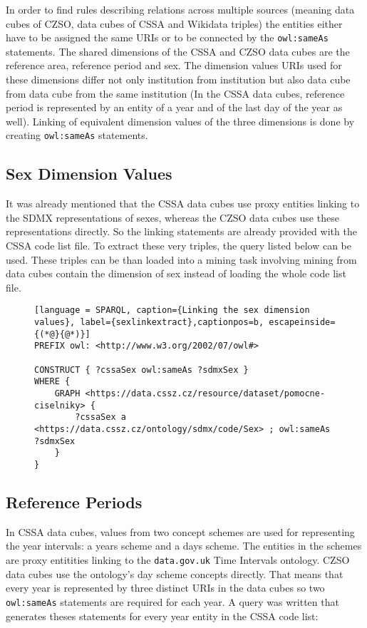 In order to find rules describing relations across multiple sources (meaning data cubes of CZSO, data cubes of CSSA and Wikidata triples) the entities either have to be assigned the same URIs or to be connected by the \verb|owl:sameAs| statements. The shared dimensions of the CSSA and CZSO data cubes are the reference area, reference period and sex. The dimension values URIs used for these dimensions differ not only institution from institution but also data cube from data cube from the same institution (In the CSSA data cubes, reference period is represented by an entity of a year and of the last day of the year as well). Linking of equivalent dimension values of the three dimensions is done by creating \verb|owl:sameAs| statements.

\subsection{Sex Dimension Values}

It was already mentioned that the CSSA data cubes use proxy entities linking to the SDMX representations of sexes, whereas the CZSO data cubes use these representations directly. So the linking statements are already provided with the CSSA code list file. To extract these very triples, the query listed below can be used. These triples can be than loaded into a mining task involving mining from data cubes contain the dimension of sex instead of loading the whole code list file.

\begin{figure}[h]
\begin{lstlisting}[language = SPARQL, caption={Linking the sex dimension values}, label={sexlinkextract},captionpos=b, escapeinside={(*@}{@*)}]
PREFIX owl: <http://www.w3.org/2002/07/owl#>

CONSTRUCT { ?cssaSex owl:sameAs ?sdmxSex }
WHERE {
    GRAPH <https://data.cssz.cz/resource/dataset/pomocne-ciselniky> {
        ?cssaSex a <https://data.cssz.cz/ontology/sdmx/code/Sex> ; owl:sameAs ?sdmxSex
    }
}
\end{lstlisting}
\end{figure}

\subsection{Reference Periods}

In CSSA data cubes, values from two concept schemes are used for representing the year intervals: a years scheme and a days scheme. The entities in the schemes are proxy entitities linking to the \verb|data.gov.uk| Time Intervals ontology. CZSO data cubes use the ontology's day scheme concepts directly. That means that every year is represented by three distinct URIs in the data cubes so two \verb|owl:sameAs| statements are required for each year. A query was written that generates theses statements for every year entity in the CSSA code list:

